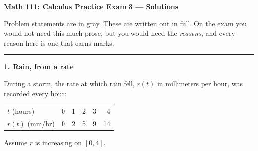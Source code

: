 \documentclass[11pt]{article}
\newcommand{\prob}[2]{\medskip\noindent\textbf{\large #1}\hfill\textit{#2}\par\smallskip}
\newenvironment{statement}{\par\color{gray!55!black}}{\par\medskip}
\newif\ifgradernotes
\begin{document}
\begin{center}
{\Large\bfseries Math 111: Calculus \quad Practice Exam 3 --- Solutions}\ifgradernotes\\[3pt]
{\large\color{blue-g} with grading notes --- not for students}\fi
\end{center}

\medskip
\noindent Problem statements are in gray. These are written out in full. On the exam you
would not need this much prose, but you would need the \emph{reasons}, and every reason
here is one that earns marks.

\bigskip\hrule
\prob{1. Rain, from a rate}{}
\begin{statement}
During a storm, the rate at which rain fell, $r(t)$ in millimeters per hour, was
recorded every hour:
\smallskip
\begin{center}
\begin{tabular}{@{}lrrrrr@{}}
\toprule
$t$ (hours) & 0 & 1 & 2 & 3 & 4\\
$r(t)$ (mm/hr) & 0 & 2 & 5 & 9 & 14\\
\bottomrule
\end{tabular}
\end{center}
\smallskip
Assume $r$ is increasing on $[0,4]$.
\end{statement}
\end{document}
